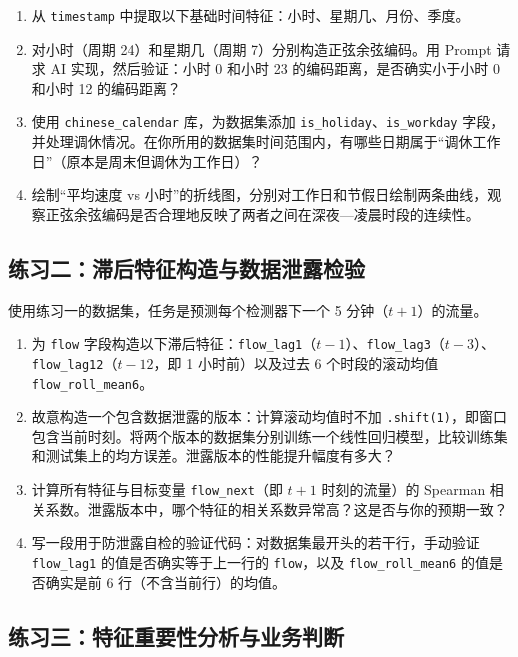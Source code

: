 \begin{enumerate}
  \item 从 \texttt{timestamp} 中提取以下基础时间特征：小时、星期几、月份、季度。
  \item 对小时（周期 24）和星期几（周期 7）分别构造正弦余弦编码。用 Prompt 请求 AI 实现，然后验证：小时 0 和小时 23 的编码距离，是否确实小于小时 0 和小时 12 的编码距离？
  \item 使用 \texttt{chinese\_calendar} 库，为数据集添加 \texttt{is\_holiday}、\texttt{is\_workday} 字段，并处理调休情况。在你所用的数据集时间范围内，有哪些日期属于“调休工作日”（原本是周末但调休为工作日）？
  \item 绘制“平均速度 vs 小时”的折线图，分别对工作日和节假日绘制两条曲线，观察正弦余弦编码是否合理地反映了两者之间在深夜—凌晨时段的连续性。
\end{enumerate}

\subsection*{练习二：滞后特征构造与数据泄露检验}

使用练习一的数据集，任务是预测每个检测器下一个 5 分钟（$t+1$）的流量。

\begin{enumerate}
  \item 为 \texttt{flow} 字段构造以下滞后特征：\texttt{flow\_lag1}（$t-1$）、\texttt{flow\_lag3}（$t-3$）、\texttt{flow\_lag12}（$t-12$，即 1 小时前）以及过去 6 个时段的滚动均值 \texttt{flow\_roll\_mean6}。
  \item 故意构造一个包含数据泄露的版本：计算滚动均值时不加 \texttt{.shift(1)}，即窗口包含当前时刻。将两个版本的数据集分别训练一个线性回归模型，比较训练集和测试集上的均方误差。泄露版本的性能提升幅度有多大？
  \item 计算所有特征与目标变量 \texttt{flow\_next}（即 $t+1$ 时刻的流量）的 Spearman 相关系数。泄露版本中，哪个特征的相关系数异常高？这是否与你的预期一致？
  \item 写一段用于防泄露自检的验证代码：对数据集最开头的若干行，手动验证 \texttt{flow\_lag1} 的值是否确实等于上一行的 \texttt{flow}，以及 \texttt{flow\_roll\_mean6} 的值是否确实是前 6 行（不含当前行）的均值。
\end{enumerate}

\subsection*{练习三：特征重要性分析与业务判断}

